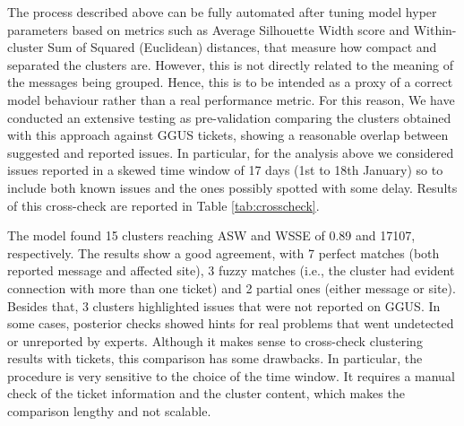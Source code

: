 The process described above can be fully automated after tuning model hyper parameters based on metrics such as Average Silhouette Width score
and Within-cluster Sum of Squared (Euclidean) distances, that measure how compact and separated the clusters are.
However, this is not directly related to the meaning of the messages being grouped. Hence, this is to be intended as a proxy of a correct model behaviour rather than a real performance metric.
For this reason, 
We have conducted an extensive testing as pre-validation comparing the clusters obtained with this approach against GGUS tickets, showing a reasonable overlap between suggested and reported issues. 
In particular, for the analysis above we considered issues reported in a skewed time window of 17 days (1st to 18th January) so to include both known issues and the ones possibly spotted with some delay.
Results of this cross-check are reported in Table \ref{tab:crosscheck}.

The model found 15 clusters reaching ASW and WSSE of 0.89 and 17107, respectively. The results show a good agreement, with 7 perfect matches (both reported message and affected site), 3 fuzzy matches (i.e., the cluster had evident connection with more than one ticket) and 2 partial ones (either message or site). Besides that, 3 clusters highlighted issues that were not reported on GGUS. In some cases, posterior checks showed hints for real problems that went undetected or unreported by experts. %
% 
Although it makes sense to cross-check clustering results with tickets, this comparison has some drawbacks. In particular, the procedure is very sensitive to the choice of the time window.
It requires a manual check of the ticket information and the cluster content, which makes the comparison lengthy and not scalable.
% 

